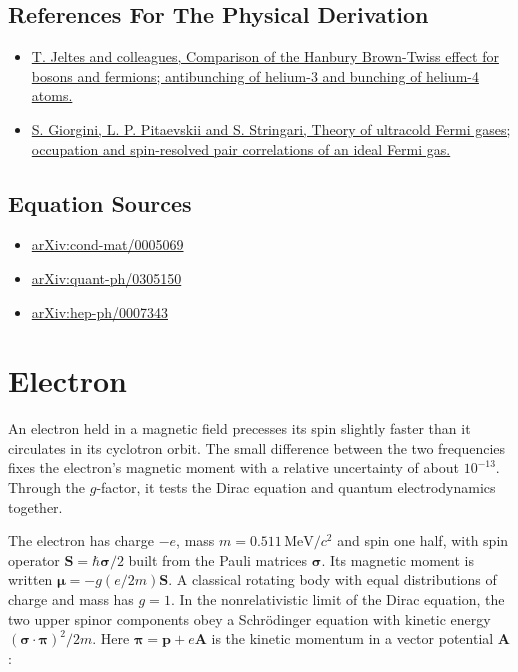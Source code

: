\documentclass[11pt,oneside]{book}
\begin{document}
\subsection*{References For The Physical Derivation}
\begin{itemize}
\item \href{https://arxiv.org/abs/cond-mat/0612278}{T. Jeltes and colleagues, Comparison of the Hanbury Brown-Twiss effect for bosons and fermions; antibunching of helium-3 and bunching of helium-4 atoms.}
\item \href{https://arxiv.org/abs/0706.3360}{S. Giorgini, L. P. Pitaevskii and S. Stringari, Theory of ultracold Fermi gases; occupation and spin-resolved pair correlations of an ideal Fermi gas.}
\end{itemize}



\subsection*{Equation Sources}
\begin{itemize}
\item \href{https://arxiv.org/abs/cond-mat/0005069}{arXiv:cond-mat/0005069}
\item \href{https://arxiv.org/abs/quant-ph/0305150}{arXiv:quant-ph/0305150}
\item \href{https://arxiv.org/abs/hep-ph/0007343}{arXiv:hep-ph/0007343}
\end{itemize}

\clearpage

\section{Electron}

\label{topic:electron}

An electron held in a magnetic field precesses its spin slightly faster than it circulates in its cyclotron orbit. The small difference between the two frequencies fixes the electron's magnetic moment with a relative uncertainty of about \(10^{-13}\). Through the \(g\)-factor, it tests the Dirac equation and quantum electrodynamics together.

The electron has charge \(-e\), mass \(m=0.511\,\mathrm{MeV}/c^2\) and spin one half, with spin operator \(\mathbf S=\hbar\boldsymbol\sigma/2\) built from the Pauli matrices \(\boldsymbol\sigma\). Its magnetic moment is written \(\boldsymbol\mu=-g(e/2m)\mathbf S\). A classical rotating body with equal distributions of charge and mass has \(g=1\). In the nonrelativistic limit of the Dirac equation, the two upper spinor components obey a Schrödinger equation with kinetic energy \((\boldsymbol\sigma\cdot\boldsymbol\pi)^2/2m\). Here \(\boldsymbol\pi=\mathbf p+e\mathbf A\) is the kinetic momentum in a vector potential \(\mathbf A\):
\end{document}
